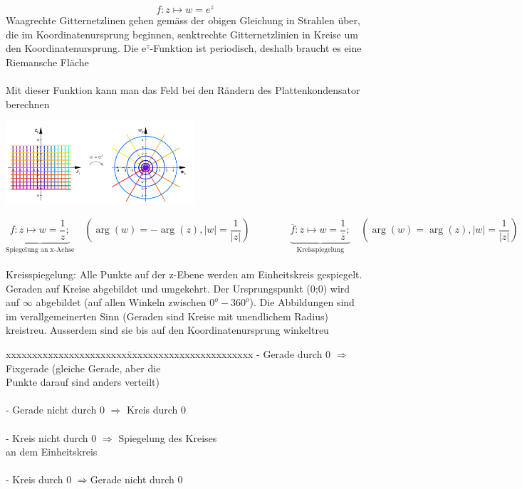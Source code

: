 	\begin{minipage}{11cm}
		$$ f : z \mapsto w = e^z $$
		Waagrechte Gitternetzlinen gehen gemäss der obigen Gleichung in Strahlen
		über, die im Koordinatenursprung beginnen, senktrechte Gitternetzlinien in
		Kreise um den Koordinatenursprung. Die e$^z$-Funktion ist periodisch, deshalb
		braucht es eine Riemansche Fläche\\ \\
		Mit dieser Funktion kann man das Feld bei den Rändern des Plattenkondensator
		berechnen 
	\end{minipage}
	\hspace{1cm}
	\begin{minipage}{7cm}
		\includegraphics[width=7cm]{./bilder/exponentional.png} 		
	\end{minipage}
\newpage
{}
	$$\underbrace{f : z \mapsto w = \frac{1}{z};}_\text{Spiegelung an x-Achse} \quad (\arg(w) = -\arg(z), |w| = \frac{1}{|z|})
	\qquad \qquad 
	\underbrace{\overline{f}: z \mapsto w = \frac{1}{\overline{z}};}_\text{Kreisspiegelung}  \quad  
	(\arg(w) = \arg(z), |w| = \frac{1}{|z|}) $$\\
	Kreisspiegelung: Alle Punkte auf der z-Ebene werden am Einheitskreis gespiegelt.
	Geraden auf Kreise abgebildet und umgekehrt. Der Ursprungspunkt (0;0) wird auf
	$ \infty $ abgebildet (auf allen Winkeln zwischen $0^o-360^o$). Die
	Abbildungen sind
	im verallgemeinerten Sinn (Geraden sind Kreise mit unendlichem Radius)
	kreistreu. Ausserdem sind sie bis auf den Koordinatenursprung winkeltreu\\
	\begin{minipage}{9cm}
		\begin{tabbing}
        	xxxxxxxxxxxxxxxxxxxxxxx\=xxxxxxxxxxxxxxxxxxxxxxxx\kill
	        - Gerade durch 0 $\Longrightarrow$ \>Fixgerade (gleiche Gerade, aber
	        die \\ \>Punkte darauf sind anders verteilt)\\ \\
			- Gerade nicht durch 0 $\Longrightarrow$ Kreis durch 0\\ \\ 
			- Kreis nicht durch 0 $\Longrightarrow$ \>Spiegelung des Kreises\\ \> an dem
			Einheitskreis\\ \\
			- Kreis durch 0 $\Longrightarrow$\>Gerade nicht durch 0
        \end{tabbing}
	\end{minipage}
